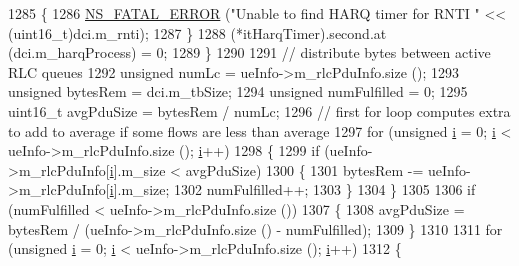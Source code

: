 \begin{DoxyCode}
1285                                 \{
1286                                         \hyperlink{group__fatal_ga5131d5e3f75d7d4cbfd706ac456fdc85}{NS\_FATAL\_ERROR} (\textcolor{stringliteral}{"Unable to find HARQ timer for RNTI "}
       << (uint16\_t)dci.m\_rnti);
1287                                 \}
1288                                 (*itHarqTimer).second.at (dci.m\_harqProcess) = 0;
1289                         \}
1290 
1291                         \textcolor{comment}{// distribute bytes between active RLC queues}
1292                         \textcolor{keywordtype}{unsigned} numLc = ueInfo->m\_rlcPduInfo.size ();
1293                         \textcolor{keywordtype}{unsigned} bytesRem = dci.m\_tbSize;
1294                         \textcolor{keywordtype}{unsigned} numFulfilled = 0;
1295                         uint16\_t avgPduSize = bytesRem / numLc;
1296                         \textcolor{comment}{// first for loop computes extra to add to average if some flows are less than
       average}
1297                         \textcolor{keywordflow}{for} (\textcolor{keywordtype}{unsigned} \hyperlink{bernuolliDistribution_8m_a6f6ccfcf58b31cb6412107d9d5281426}{i} = 0; \hyperlink{bernuolliDistribution_8m_a6f6ccfcf58b31cb6412107d9d5281426}{i} < ueInfo->m\_rlcPduInfo.size (); 
      \hyperlink{bernuolliDistribution_8m_a6f6ccfcf58b31cb6412107d9d5281426}{i}++)
1298                         \{
1299                                 \textcolor{keywordflow}{if} (ueInfo->m\_rlcPduInfo[\hyperlink{bernuolliDistribution_8m_a6f6ccfcf58b31cb6412107d9d5281426}{i}].m\_size < avgPduSize)
1300                                 \{
1301                                         bytesRem -= ueInfo->m\_rlcPduInfo[\hyperlink{bernuolliDistribution_8m_a6f6ccfcf58b31cb6412107d9d5281426}{i}].m\_size;
1302                                         numFulfilled++;
1303                                 \}
1304                         \}
1305 
1306                         \textcolor{keywordflow}{if} (numFulfilled < ueInfo->m\_rlcPduInfo.size ())
1307                         \{
1308                                 avgPduSize = bytesRem / (ueInfo->m\_rlcPduInfo.size () - numFulfilled);
1309                         \}
1310 
1311                         \textcolor{keywordflow}{for} (\textcolor{keywordtype}{unsigned} \hyperlink{bernuolliDistribution_8m_a6f6ccfcf58b31cb6412107d9d5281426}{i} = 0; \hyperlink{bernuolliDistribution_8m_a6f6ccfcf58b31cb6412107d9d5281426}{i} < ueInfo->m\_rlcPduInfo.size (); 
      \hyperlink{bernuolliDistribution_8m_a6f6ccfcf58b31cb6412107d9d5281426}{i}++)
1312                         \{

\end{DoxyCode}
